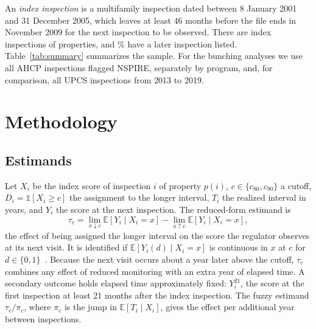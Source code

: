 \documentclass[10pt,twocolumn,letterpaper]{article}
\newcommand{\tabnote}[1]{\par\vspace{0.4ex}{\scriptsize\raggedright #1\par}}
\begin{document}
An \emph{index inspection} is a multifamily inspection dated between 8 January 2001 and 31 December 2005, which leaves at least 46 months before the file ends in November 2009 for the next inspection to be observed. There are \nIndex{} index inspections of \nIndexProps{} properties, and \shareNext\% have a later inspection listed. Table~\ref{tab:summary} summarizes the sample. For the bunching analyses we use all AHCP inspections flagged NSPIRE, separately by program, and, for comparison, all UPCS inspections from 2013 to 2019.

\begin{table}[t]
\caption{Primary sample: multifamily index inspections, 2001--2005}\label{tab:summary}
\centering\scriptsize\setlength{\tabcolsep}{3.5pt}

\tabnote{``Next'' variables are for index inspections with a later inspection listed. P10 and P90 are the 10th and 90th percentiles.}
\end{table}

\section{Methodology}\label{sec:method}
\subsection{Estimands}
Let $X_i$ be the index score of inspection $i$ of property $p(i)$, $c\in\{c_{80},c_{90}\}$ a cutoff, $D_i=\mathbb 1[X_i\ge c]$ the assignment to the longer interval, $T_i$ the realized interval in years, and $Y_i$ the score at the next inspection. The reduced-form estimand is
\begin{equation}
\tau_c=\lim_{x\downarrow c}\mathbb E[Y_i\mid X_i=x]-\lim_{x\uparrow c}\mathbb E[Y_i\mid X_i=x],
\end{equation}
the effect of being assigned the longer interval on the score the regulator observes at its next visit. It is identified if $\mathbb E[Y_i(d)\mid X_i=x]$ is continuous in $x$ at $c$ for $d\in\{0,1\}$~\cite{lee2010}. Because the next visit occurs about a year later above the cutoff, $\tau_c$ combines any effect of reduced monitoring with an extra year of elapsed time. A secondary outcome holds elapsed time approximately fixed: $Y_i^{21}$, the score at the first inspection at least 21 months after the index inspection. The fuzzy estimand $\tau_c/\pi_c$, where $\pi_c$ is the jump in $\mathbb E[T_i\mid X_i]$, gives the effect per additional year between inspections.
\end{document}
